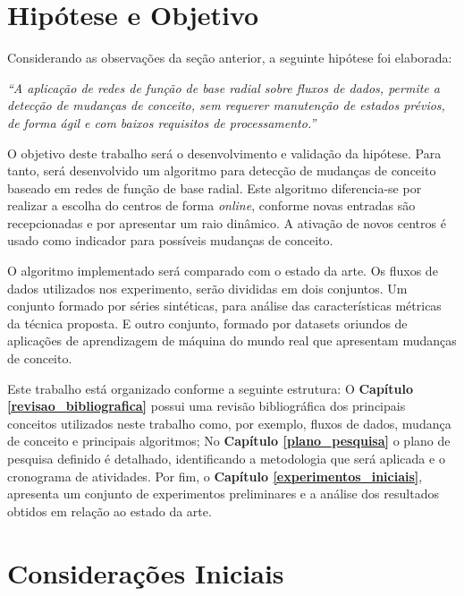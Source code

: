 \documentclass[qual, classic, a4paper]{ufbathesis}
\begin{document}
\section{Hipótese e Objetivo}

Considerando as observações da seção anterior, a seguinte hipótese foi elaborada:

\begin{center}
\textit{``A aplicação de redes de função de base radial sobre fluxos de dados, permite a detecção de mudanças de conceito, sem requerer manutenção de estados prévios, de forma ágil e com baixos requisitos de processamento.''}
\end{center}

O objetivo deste trabalho será o desenvolvimento e validação da hipótese.
Para tanto, será desenvolvido um algoritmo para detecção de mudanças de conceito baseado em redes de função de base radial. Este algoritmo diferencia-se por realizar a escolha do centros de forma \textit{online}, conforme novas entradas são recepcionadas e por apresentar um raio dinâmico. 
A ativação de novos centros é usado como indicador para possíveis mudanças de conceito.

O algoritmo implementado será comparado com o estado da arte. Os fluxos de dados utilizados nos experimento, serão divididas em dois conjuntos. Um conjunto formado por séries sintéticas, para análise das características métricas da técnica proposta. E outro conjunto, formado por datasets oriundos de aplicações de aprendizagem de máquina do mundo real que apresentam mudanças de conceito.

Este trabalho está organizado conforme a seguinte estrutura: O \textbf{Capítulo \ref{revisao_bibliografica}} possui uma revisão bibliográfica dos principais conceitos utilizados neste trabalho como, por exemplo, fluxos de dados, mudança de conceito e principais algoritmos; No \textbf{Capítulo \ref{plano_pesquisa}} o plano de pesquisa definido é detalhado, identificando a metodologia que será aplicada e o cronograma de atividades. Por fim, o \textbf{Capítulo \ref{experimentos_iniciais}}, apresenta um conjunto de experimentos preliminares e a análise dos resultados obtidos em relação ao estado da arte.

 \label{revisao_bibliografica}
\section{Considerações Iniciais}
\end{document}
